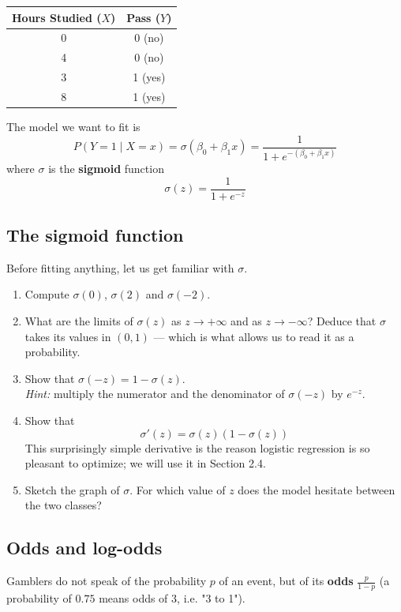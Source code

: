 \documentclass[]{article}
\begin{document}
	\begin{table}[h!]
		\centering
		\begin{tabular}{|c|c|}
			\hline
			Hours Studied ($X$) & Pass ($Y$) \\
			\hline
			0 & 0 (no) \\
			4 & 0 (no) \\
			3 & 1 (yes) \\
			8 & 1 (yes) \\
			\hline
		\end{tabular}
	\end{table}

	\noindent
	The model we want to fit is
	$$P(Y=1 \mid X=x) = \sigma\left(\beta_0 + \beta_1 x\right) = \frac{1}{1 + e^{-(\beta_0 + \beta_1 x)}}$$
	where $\sigma$ is the \textbf{sigmoid} function
	$$\sigma(z) = \frac{1}{1+e^{-z}}$$

	\subsection{The sigmoid function}
	Before fitting anything, let us get familiar with $\sigma$.
	\begin{enumerate}
		\item Compute $\sigma(0)$, $\sigma(2)$ and $\sigma(-2)$.
		\item What are the limits of $\sigma(z)$ as $z \to +\infty$ and as $z \to -\infty$?
		Deduce that $\sigma$ takes its values in $(0,1)$ --- which is what allows us to read it as a probability.
		\item Show that $\sigma(-z) = 1 - \sigma(z)$.\\
		\textit{Hint:} multiply the numerator and the denominator of $\sigma(-z)$ by $e^{-z}$.
		\item Show that
		$$\sigma'(z) = \sigma(z)\left(1 - \sigma(z)\right)$$
		This surprisingly simple derivative is the reason logistic regression is so pleasant to optimize; we will use it in Section 2.4.
		\item Sketch the graph of $\sigma$.
		For which value of $z$ does the model hesitate between the two classes?
	\end{enumerate}

	\subsection{Odds and log-odds}
	Gamblers do not speak of the probability $p$ of an event, but of its \textbf{odds} $\frac{p}{1-p}$ (a probability of $0.75$ means odds of $3$, i.e. "3 to 1").
\end{document}

